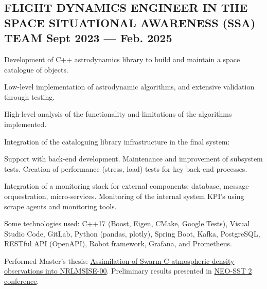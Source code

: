 \documentclass[letter,10pt]{article}
\begin{document}
\subsection{{FLIGHT DYNAMICS ENGINEER IN THE SPACE SITUATIONAL AWARENESS (SSA) TEAM \hfill Sept 2023  --- Feb. 2025}}
\begin{zitemize}
\item Development of C++ astrodynamics library to build and maintain a space catalogue of objects.
\begin{zitemize}
    \item Low-level implementation of astrodynamic algorithms, and extensive validation through testing.
    \item High-level analysis of the functionality and limitations of the algorithms implemented.
\end{zitemize}
\item Integration of the cataloguing library infrastructure in the final system:
\begin{zitemize}
    \item Support with back-end development. Maintenance and improvement of subsystem tests. Creation of performance (stress, load) tests for key back-end processes. 
    \item Integration of a monitoring stack for external components: database, message orquestration, micro-services. Monitoring of the internal system KPI's using scrape agents and monitoring tools.
\end{zitemize}
\item Some technologies used: C++17 (Boost, Eigen, CMake, Google Tests), Visual Studio Code, GitLab, Python (pandas, plotly), Spring Boot, Kafka, PostgreSQL, RESTful API (OpenAPI), Robot framework, Grafana, and Prometheus.
\item Performed Master's thesis: \href{https://repository.tudelft.nl/islandora/object/uuid:f472201e-0e32-4b9e-8aa3-04521908396a}{Assimilation of Swarm C atmospheric density observations into NRLMSISE-00}. Preliminary results presented in \href{https://conference.sdo.esoc.esa.int/proceedings/neosst2/paper/90/NEOSST2-paper90.pdf}{NEO-SST 2 conference}.%
\end{zitemize}
\end{document}
